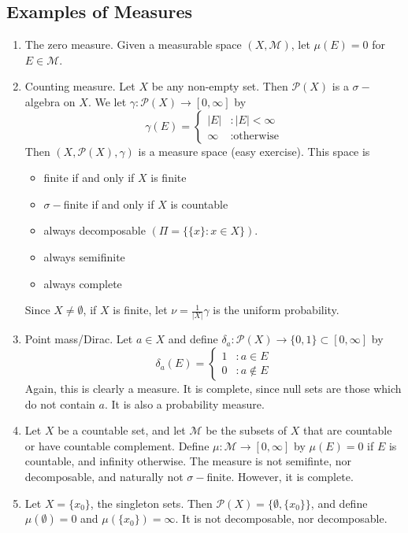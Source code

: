 \documentclass[11pt, a4paper]{memoir}
\theoremstyle{change}
\theoremstyle{plain}
\theoremstyle{nonumberplain}
\begin{document}
\subsection{Examples of Measures}
\begin{enumerate}
    \item The zero measure.
        Given a measurable space $(X,\mathcal{M})$, let $\mu(E)=0$ for $E\in\mathcal{M}$.
    \item Counting measure.
        Let $X$ be any non-empty set.
        Then $\mathcal{P}(X)$ is a $\sigma-$algebra on $X$.
        We let $\gamma:\mathcal{P}(X)\to[0,\infty]$ by
        \begin{equation*}
            \gamma(E)=
            \begin{cases}
                |E| &: |E|<\infty\\
                \infty &: \text{otherwise}
            \end{cases}
        \end{equation*}
        Then $(X,\mathcal{P}(X),\gamma)$ is a measure space (easy exercise).
        This space is
        \begin{itemize}[nolistsep]
            \item finite if and only if $X$ is finite
            \item $\sigma-$finite if and only if $X$ is countable
            \item always decomposable $(\Pi=\{\{x\}:x\in X\})$.
            \item always semifinite
            \item always complete
        \end{itemize}
        Since $X\neq\emptyset$, if $X$ is finite, let $\nu=\frac{1}{|X|}\gamma$ is the uniform probability.
    \item Point mass/Dirac.
        Let $a\in X$ and define $\delta_a:\mathcal{P}(X)\to\{0,1\}\subset[0,\infty]$ by
        \begin{equation*}
            \delta_a(E)=
            \begin{cases}
                1 &: a\in E\\
                0 &: a\notin E
            \end{cases}
        \end{equation*}
        Again, this is clearly a measure.
        It is complete, since null sets are those which do not contain $a$.
        It is also a probability measure.
    \item Let $X$ be a countable set, and let $\mathcal{M}$ be the subsets of $X$ that are countable or have countable complement.
        Define $\mu:\mathcal{M}\to[0,\infty]$ by $\mu(E)=0$ if $E$ is countable, and infinity otherwise.
        The measure is not semifinte, nor decomposable, and naturally not $\sigma-$finite.
        However, it is complete.
    \item Let $X=\{x_0\}$, the singleton sets.
        Then $\mathcal{P}(X)=\{\emptyset,\{x_0\}\}$, and define $\mu(\emptyset)=0$ and $\mu(\{x_0\})=\infty$.
        It is not decomposable, nor decomposable.
\end{enumerate}
\end{document}

